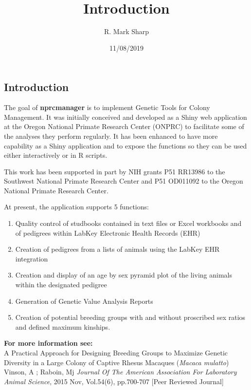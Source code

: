 \documentclass[]{article}
\title{Introduction}
\author{R. Mark Sharp}
\date{11/08/2019}
\providecommand{\tightlist}{%
  \setlength{\itemsep}{0pt}\setlength{\parskip}{0pt}}
\begin{document}
\maketitle

\hypertarget{introduction}{%
\subsection{Introduction}\label{introduction}}

The goal of \textbf{nprcmanager} is to implement Genetic Tools for
Colony Management. It was initially conceived and developed as a Shiny
web application at the Oregon National Primate Research Center (ONPRC)
to facilitate some of the analyses they perform regularly. It has been
enhanced to have more capability as a Shiny application and to expose
the functions so they can be used either interactively or in R scripts.

This work has been supported in part by NIH grants P51 RR13986 to the
Southwest National Primate Research Center and P51 OD011092 to the
Oregon National Primate Research Center.

At present, the application supports 5 functions:

\begin{enumerate}
\def\labelenumi{\arabic{enumi}.}
\tightlist
\item
  Quality control of studbooks contained in text files or Excel
  workbooks and of pedigrees within LabKey Electronic Health Records
  (EHR)
\item
  Creation of pedigrees from a lists of animals using the LabKey EHR
  integration
\item
  Creation and display of an age by sex pyramid plot of the living
  animals within the designated pedigree
\item
  Generation of Genetic Value Analysis Reports
\item
  Creation of potential breeding groups with and without proscribed sex
  ratios and defined maximum kinships.
\end{enumerate}

\textbf{For more information see:}\\
A Practical Approach for Designing Breeding Groups to Maximize Genetic
Diversity in a Large Colony of Captive Rhesus Macaques (\emph{Macaca
mulatto}) Vinson, A ; Raboin, Mj \emph{Journal Of The American
Association For Laboratory Animal Science}, 2015 Nov, Vol.54(6),
pp.700-707 {[}Peer Reviewed Journal{]}
\end{document}
